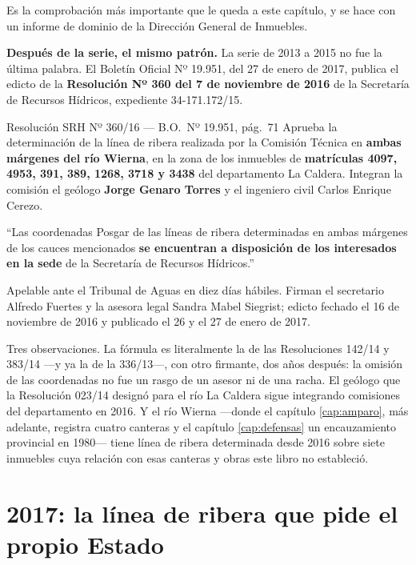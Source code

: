 Es la comprobación más importante que le queda a este capítulo, y se hace con un informe de dominio de la Dirección General de Inmuebles.

\begin{cautela}
\textbf{Después de la serie, el mismo patrón.} La serie de 2013 a 2015 no fue la última palabra. El Boletín Oficial Nº 19.951, del 27 de enero de 2017, publica el edicto de la \textbf{Resolución Nº 360 del 7 de noviembre de 2016} de la Secretaría de Recursos Hídricos, expediente 34-171.172/15.

\end{cautela}

\begin{ficha}{Resolución SRH Nº 360/16 --- B.O.\ Nº 19.951, pág.\ 71}
Aprueba la determinación de la línea de ribera realizada por la Comisión Técnica en \textbf{ambas márgenes del río Wierna}, en la zona de los inmuebles de \textbf{matrículas 4097, 4953, 391, 389, 1268, 3718 y 3438} del departamento La Caldera. Integran la comisión el geólogo \textbf{Jorge Genaro Torres} y el ingeniero civil Carlos Enrique Cerezo.

``Las coordenadas Posgar de las líneas de ribera determinadas en ambas márgenes de los cauces mencionados \textbf{se encuentran a disposición de los interesados en la sede} de la Secretaría de Recursos Hídricos.''

Apelable ante el Tribunal de Aguas en diez días hábiles. Firman el secretario Alfredo Fuertes y la asesora legal Sandra Mabel Siegrist; edicto fechado el 16 de noviembre de 2016 y publicado el 26 y el 27 de enero de 2017.
\end{ficha}

\begin{cautela}

Tres observaciones. La fórmula es literalmente la de las Resoluciones 142/14 y 383/14 ---y ya la de la 336/13---, con otro firmante, dos años después: la omisión de las coordenadas no fue un rasgo de un asesor ni de una racha. El geólogo que la Resolución 023/14 designó para el río La Caldera sigue integrando comisiones del departamento en 2016. Y el río Wierna ---donde el capítulo \ref{cap:amparo}, más adelante, registra cuatro canteras y el capítulo \ref{cap:defensas} un encauzamiento provincial en 1980--- tiene línea de ribera determinada desde 2016 sobre siete inmuebles cuya relación con esas canteras y obras este libro no estableció.
\end{cautela}

\section{2017: la línea de ribera que pide el propio Estado}

